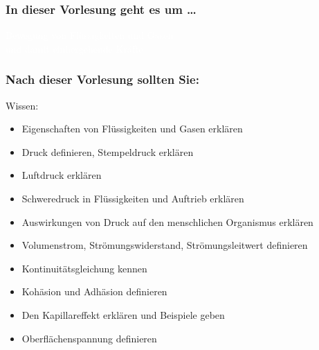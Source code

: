 \documentclass{beamer}
\begin{document}

{

\begin{frame}[plain]

\frametitle{In dieser Vorlesung geht es um \dots}

\textcolor{white}{Bewegung von Flüssigkeiten und Gasen \\ und damit einhergehende Kräfte}

\vfill

 
\end{frame}
}


 
\begin{frame}

\frametitle{Nach dieser Vorlesung sollten Sie:}



\begin{block}{Wissen:}
\begin{itemize}
\item
Eigenschaften von Flüssigkeiten und Gasen erklären
\item
Druck definieren, Stempeldruck erklären
\item
Luftdruck erklären 
\item
Schweredruck in Flüssigkeiten und Auftrieb erklären
\item
Auswirkungen von Druck auf den menschlichen Organismus erklären
\item
Volumenstrom, Strömungswiderstand, Strömungsleitwert definieren 
\item
Kontinuitätsgleichung kennen 
\item
Kohäsion und Adhäsion definieren
\item
Den Kapillareffekt erklären und Beispiele geben
\item
Oberflächenspannung definieren
\end{itemize}

\end{block}

\end{frame}
\end{document}

